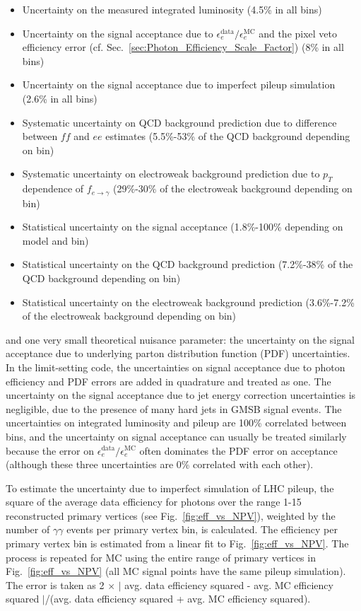 \documentclass[dissertation.tex]{subfiles}
\begin{document}
\begin{itemize}
\item Uncertainty on the measured integrated luminosity (4.5\% in all bins) \cite{CMS_PAS_EWK-11-001}
\item Uncertainty on the signal acceptance due to $\epsilon_{e}^{\mathrm{data}}/\epsilon_{e}^{\mathrm{MC}}$ and the pixel veto efficiency error (cf. Sec.~\ref{sec:Photon_Efficiency_Scale_Factor}) (8\% in all bins)
\item Uncertainty on the signal acceptance due to imperfect pileup simulation (2.6\% in all bins)
\item Systematic uncertainty on QCD background prediction due to difference between $\mathit{ff}$ and $ee$ estimates (5.5\%-53\% of the QCD background depending on bin)
\item Systematic uncertainty on electroweak background prediction due to $p_{T}$ dependence of $f_{e\rightarrow\gamma}$ (29\%-30\% of the electroweak background depending on bin)
\item Statistical uncertainty on the signal acceptance (1.8\%-100\% depending on model and bin)
\item Statistical uncertainty on the QCD background prediction (7.2\%-38\% of the QCD background depending on bin)
\item Statistical uncertainty on the electroweak background prediction (3.6\%-7.2\% of the electroweak background depending on bin)
\end{itemize}
%
and one very small theoretical nuisance parameter: the uncertainty on the signal acceptance due to underlying parton distribution function (PDF) uncertainties.  In the limit-setting code, the uncertainties on signal acceptance due to photon efficiency and PDF errors are added in quadrature and treated as one.  The uncertainty on the signal acceptance due to jet energy correction uncertainties is negligible, due to the presence of many hard jets in GMSB signal events.  The uncertainties on integrated luminosity and pileup are 100\% correlated between \MET bins, and the uncertainty on signal acceptance can usually be treated similarly because the error on $\epsilon_{e}^{\mathrm{data}}/\epsilon_{e}^{\mathrm{MC}}$ often dominates the PDF error on acceptance (although these three uncertainties are 0\% correlated with each other).

To estimate the uncertainty due to imperfect simulation of LHC pileup, the square of the average data efficiency for photons over the range 1-15 reconstructed primary vertices (see Fig.~\ref{fig:eff_vs_NPV}), weighted by the number of $\gamma\gamma$ events per primary vertex bin, is calculated.  The efficiency per primary vertex bin is estimated from a linear fit to Fig.~\ref{fig:eff_vs_NPV}.  The process is repeated for MC using the entire range of primary vertices in Fig.~\ref{fig:eff_vs_NPV} (all MC signal points have the same pileup simulation).  The error is taken as 2 $\times$ $|$ avg. data efficiency squared - avg. MC efficiency squared $|$/(avg. data efficiency squared + avg. MC efficiency squared).
\end{document}
